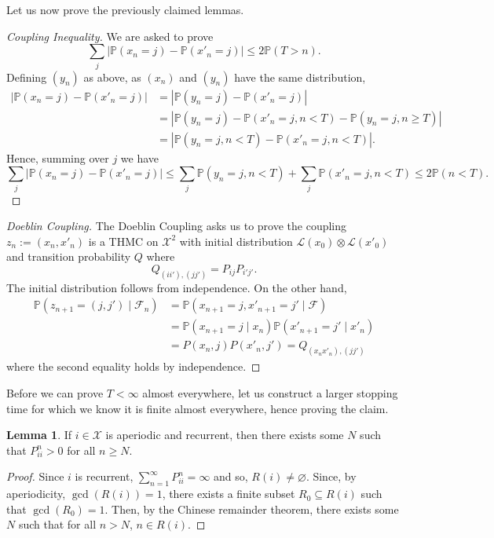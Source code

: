 \documentclass[]{article}
\theoremstyle{definition}
\theoremstyle{definition}
\newtheorem{lemma}{Lemma}[section]
\begin{document}
Let us now prove the previously claimed lemmas. 

\begin{proof}[Coupling Inequality]
  We are asked to prove 
  \[\sum_{j} |\mathbb{P}(x_n = j) - \mathbb{P}(x'_n = j)| \le 2\mathbb{P}(T > n).\]
  Defining \((y_n)\) as above, as \((x_n)\) and \((y_n)\) have the same 
  distribution, 
  \[\begin{split}
    |\mathbb{P}(x_n = j) - \mathbb{P}(x'_n = j)| & = 
    |\mathbb{P}(y_n = j) - \mathbb{P}(x'_n = j)|\\ 
    & = |\mathbb{P}(y_n = j) - \mathbb{P}(x'_n = j, n < T) - 
      \mathbb{P}(y_n = j, n \ge T)|\\
    & = |\mathbb{P}(y_n = j, n < T) - \mathbb{P}(x'_n = j, n < T)|.
  \end{split}\]
  Hence, summing over \(j\) we have 
  \[\sum_j|\mathbb{P}(x_n = j) - \mathbb{P}(x'_n = j)| \le 
    \sum_j \mathbb{P}(y_n = j, n < T) + \sum_j \mathbb{P}(x'_n = j, n < T) 
    \le 2 \mathbb{P}(n < T).\]
\end{proof}

\begin{proof}[Doeblin Coupling]
  The Doeblin Coupling asks us to prove the coupling \(z_n := (x_n, x'_n)\) 
  is a THMC on \(\mathcal{X}^2\) with initial distribution 
  \(\mathcal{L}(x_0) \otimes \mathcal{L}(x'_0)\) and transition probability \(Q\) 
  where 
  \[Q_{(ii'),(jj')} = P_{ij} P_{i'j'}.\]
  The initial distribution follows from independence. On the other hand, 
  \[\begin{split}
    \mathbb{P}(z_{n + 1} = (j, j') \mid \mathcal{F}_n) & = 
    \mathbb{P}(x_{n + 1} = j, x'_{n + 1} = j' \mid \mathcal{F})\\
    & = \mathbb{P}(x_{n + 1} = j \mid x_n)\mathbb{P}(x'_{n + 1} = j' \mid x'_n)\\
    & = P(x_n, j) P(x'_n, j') = Q_{(x_n x'_n), (jj')}
  \end{split}\]
  where the second equality holds by independence.
\end{proof}

Before we can prove \(T < \infty\) almost everywhere, let us construct a larger 
stopping time for which we know it is finite almost everywhere, hence proving the 
claim.

\begin{lemma}
  If \(i \in \mathcal{X}\) is aperiodic and recurrent, then there exists some  
  \(N\) such that \(P^n_{ii} > 0\) for all \(n \ge N\).
\end{lemma}
\begin{proof}
  Since \(i\) is recurrent, \(\sum_{n = 1}^\infty P^n_{ii} = \infty\) and so, 
  \(R(i) \neq \varnothing\). Since, by aperiodicity, \(\gcd(R(i)) = 1\), there 
  exists a finite subset \(R_0 \subseteq R(i)\) such that \(\gcd(R_0) = 1\).
  Then, by the Chinese remainder theorem, there exists some \(N\) such that 
  for all \(n > N\), \(n \in R(i)\).
\end{proof}
\end{document}
